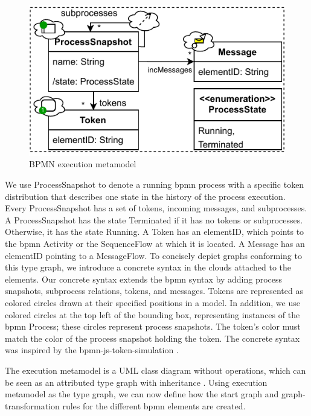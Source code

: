 \documentclass[runningheads]{llncs}
\begin{document}
\begin{figure}[ht]
  \centering
  \includegraphics[width=0.6\linewidth]{images/bpmn_semantics-typegraph.pdf}
  \caption{BPMN execution metamodel}
  \label{fig:typeGraph}
\end{figure}

We use \textsf{ProcessSnapshot} to denote a running \gls*{bpmn} process with a specific token distribution that describes one state in the history of the process execution.
Every \textsf{ProcessSnapshot} has a set of \textsf{tokens}, incoming \textsf{messages}, and \textsf{subprocesses}.
A \textsf{ProcessSnapshot} has the state \textsf{Terminated} if it has no \textsf{tokens} or \textsf{subprocesses}.
Otherwise, it has the state \textsf{Running}.
A \textsf{Token} has an \textsf{elementID}, which points to the \gls*{bpmn} \textsf{Activity} or the \textsf{SequenceFlow} at which it is located.
A \textsf{Message} has an \textsf{elementID} pointing to a \textsf{MessageFlow}.
To concisely depict graphs conforming to this type graph, we introduce a concrete syntax in the clouds attached to the elements.
Our concrete syntax extends the \gls*{bpmn} syntax by adding process snapshots, subprocess relations, tokens, and messages.
Tokens are represented as colored circles drawn at their specified positions in a model.
In addition, we use colored circles at the top left of the bounding box, representing instances of the \gls*{bpmn} \textsf{Process}; these circles represent process snapshots.
The token's color must match the color of the process snapshot holding the token.
The concrete syntax was inspired by the bpmn-js-token-simulation \cite{camundaservicesgmbhBpmnjsTokenSimulation2023}.


The execution metamodel is a UML class diagram without operations, which can be seen as an attributed type graph with inheritance \cite{heckelGraphTransformationSoftware2020}.
Using execution metamodel as the type graph, we can now define how the start graph and graph-transformation rules for the different \gls*{bpmn} elements are created.
\end{document}
